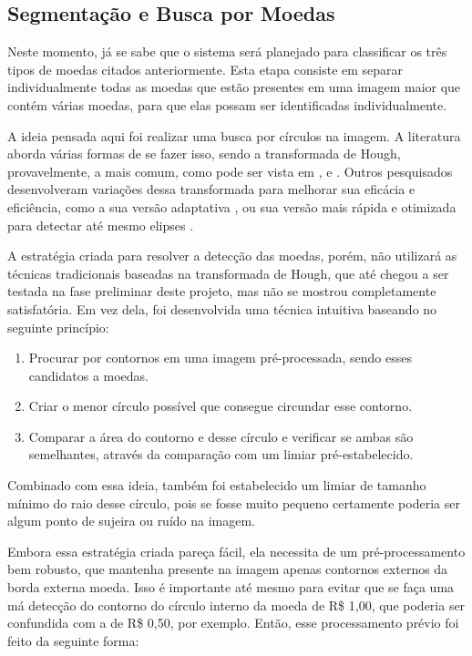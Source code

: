 \documentclass[10pt,journal]{IEEEtran}
\begin{document}
\subsection{Segmentação e Busca por Moedas}
\label{sec:segmentacao}

Neste momento, já se sabe que o sistema será planejado para classificar os três tipos de moedas citados anteriormente. Esta etapa consiste em separar individualmente todas as moedas que estão presentes em uma imagem maior que contém várias moedas, para que elas possam ser identificadas individualmente.

A ideia pensada aqui foi realizar uma busca por círculos na imagem. A literatura aborda várias formas de se fazer isso, sendo a transformada de Hough, provavelmente, a mais comum, como pode ser vista em \cite{ioannou1999circle}, \cite{kerbyson1995circle} e \cite{yuen1990comparative}. Outros pesquisados desenvolveram variações dessa transformada para melhorar sua eficácia e eficiência, como a sua versão adaptativa \cite{illingworth1987adaptive}, ou sua versão mais rápida e otimizada para detectar até mesmo elipses \cite{guil1997lower}.

A estratégia criada para resolver a detecção das moedas, porém, não utilizará as técnicas tradicionais baseadas na transformada de Hough, que até chegou a ser testada na fase preliminar deste projeto, mas não se mostrou completamente satisfatória. Em vez dela, foi desenvolvida uma técnica intuitiva baseando no seguinte princípio:

\begin{enumerate}
\item Procurar por contornos em uma imagem pré-processada, sendo esses candidatos a moedas.
\item Criar o menor círculo possível que consegue circundar esse contorno.
\item Comparar a área do contorno e desse círculo e verificar se ambas são semelhantes, através da comparação com um limiar pré-estabelecido.
\end{enumerate}

Combinado com essa ideia, também foi estabelecido um limiar de tamanho mínimo do raio desse círculo, pois se fosse muito pequeno certamente poderia ser algum ponto de sujeira ou ruído na imagem.

Embora essa estratégia criada pareça fácil, ela necessita de um pré-processamento bem robusto, que mantenha presente na imagem apenas contornos externos da borda externa moeda. Isso é importante até mesmo para evitar que se faça uma má detecção do contorno do círculo interno da moeda de R\$ 1,00, que poderia ser confundida com a de R\$ 0,50, por exemplo. Então, esse processamento prévio foi feito da seguinte forma:
\end{document}
